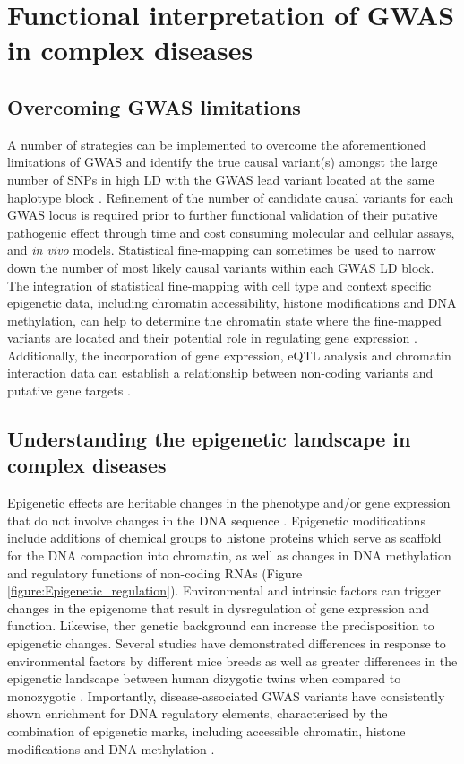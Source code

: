 \section{Functional interpretation of GWAS in complex diseases}

\subsection{Overcoming GWAS limitations}
A number of strategies can be implemented to overcome the aforementioned limitations of GWAS and identify the true causal variant(s) amongst the large number of SNPs in high LD with the GWAS lead variant located at the same haplotype block  \parencite{Edwards2013}. Refinement of the number of candidate causal variants for each GWAS locus is required prior to further functional validation of their putative pathogenic effect through time and cost consuming molecular and cellular assays, and \textit{in vivo} models. Statistical fine-mapping can sometimes be used to narrow down the number of most likely causal variants within each GWAS LD block. The integration of statistical fine-mapping with cell type and context specific epigenetic data, including chromatin accessibility, histone modifications and DNA methylation, can help to determine the chromatin state where the fine-mapped variants are located and their potential role in regulating gene expression \parencite{Petronis2010}. Additionally, the incorporation of gene expression, eQTL analysis and chromatin interaction data can establish a relationship between non-coding variants and putative gene targets \parencite{Calderon2018}.


\subsection{Understanding the epigenetic landscape in complex diseases}
\label{subsec:Epigenetics}

Epigenetic effects are heritable changes in the phenotype and/or gene expression that do not involve changes in the DNA sequence \parencite{Feil2012}. Epigenetic modifications include additions of chemical groups to histone proteins which serve as scaffold for the DNA compaction into chromatin, as well as changes in DNA methylation and regulatory functions of non-coding RNAs (Figure \ref{figure:Epigenetic_regulation}). Environmental and intrinsic factors can trigger changes in the epigenome that result in dysregulation of gene expression and function.  Likewise, ther genetic background can increase the predisposition to epigenetic changes. Several studies have demonstrated differences in response to environmental factors by different mice breeds as well as greater differences in the epigenetic landscape between human dizygotic twins when compared to monozygotic \parencite{Pogribny2009,Kaminsky2009}. Importantly, disease-associated GWAS variants have consistently shown enrichment for DNA regulatory elements, characterised by the combination of epigenetic marks, including accessible chromatin, histone modifications and DNA methylation \parencite{Trynka2013,Trynka2013b,Gusev2014}. 

